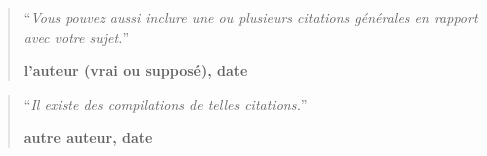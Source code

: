 \begin{quotation}
\noindent ``\emph{Vous pouvez aussi inclure une ou plusieurs citations générales en rapport avec votre sujet.}''
\begin{flushright}\textbf{l'auteur (vrai ou supposé), date}\end{flushright}
\end{quotation}

\medskip

\begin{quotation}
\noindent ``\emph{Il existe des compilations de telles citations.}''
\begin{flushright}\textbf{autre auteur, date}\end{flushright}
\end{quotation}
